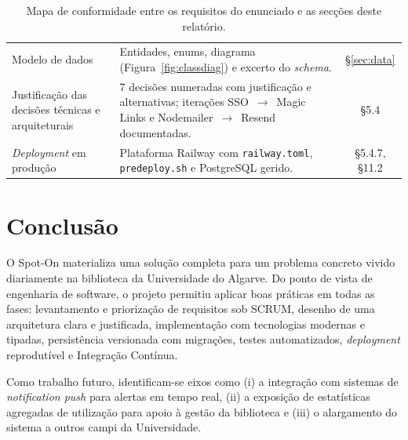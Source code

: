 \documentclass[11pt,a4paper]{article}
\begin{document}
\begin{table}[H]
\begin{tabularx}{\linewidth}{@{}p{4.2cm}Xc@{}}
        Modelo de dados                                         & Entidades, enums, diagrama (Figura~\ref{fig:classdiag}) e excerto do \emph{schema}.                                    & \S\ref{sec:data}                       \\
        Justificação das decisões técnicas e arquiteturais      & 7 decisões numeradas com justificação e alternativas; iterações SSO~$\to$~Magic Links e Nodemailer~$\to$~Resend documentadas. & \S5.4                            \\
        \emph{Deployment} em produção                           & Plataforma Railway com \texttt{railway.toml}, \texttt{predeploy.sh} e PostgreSQL gerido.                               & \S5.4.7, \S11.2                        \\
        \bottomrule
    \end{tabularx}
    \caption{Mapa de conformidade entre os requisitos do enunciado e as
        secções deste relatório.}
\end{table}

\section{Conclusão}

O Spot-On materializa uma solução completa para um problema concreto vivido
diariamente na biblioteca da Universidade do Algarve. Do ponto de vista de
engenharia de software, o projeto permitiu aplicar boas práticas em todas as
fases: levantamento e priorização de requisitos sob SCRUM, desenho de uma
arquitetura clara e justificada, implementação com tecnologias modernas e
tipadas, persistência versionada com migrações, testes automatizados,
\emph{deployment} reprodutível e Integração Contínua.

Como trabalho futuro, identificam-se eixos como (i) a integração com sistemas
de \emph{notification push} para alertas em tempo real, (ii) a exposição de
estatísticas agregadas de utilização para apoio à gestão da biblioteca e (iii)
o alargamento do sistema a outros campi da Universidade.
\end{document}
